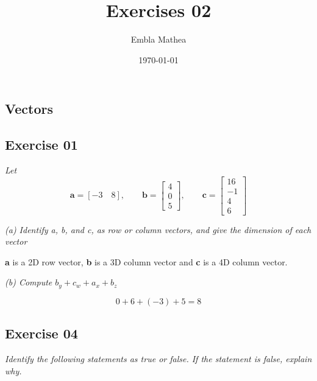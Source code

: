 \documentclass[12pt, a4paper]{article}
\title{Exercises 02}
\author{Embla Mathea}
\date{\today}
\begin{document}
\maketitle

\begin{center}
	\section*{Vectors}	
\end{center}

\subsection*{Exercise 01}

\quad

\textit{Let}
\begin{equation}
		\tag*{}
		\mathbf{a} = \left[-3\quad8\right], \qquad			
		\mathbf{b} =
		\begin{bmatrix}
		4\\0\\5
		\end{bmatrix}, \qquad		
		\mathbf{c} =
		\begin{bmatrix}
		16\\-1\\4\\6
		\end{bmatrix}
\end{equation}

\textit{(a) Identify a, b, and c, as row or column vectors, and give the dimension
of each vector}

	\begin{center}
		\textbf{a} is a 2D row vector, \textbf{b} is a 3D column vector 	
		and \textbf{c} is a 4D column vector. \\
	\end{center}

\textit{(b) Compute $b_y + c_w + a_x + b_z$}

	\begin{equation}
		\tag*{}
		0 + 6 + (-3) + 5 = 8
	\end{equation}
	
\subsection*{Exercise 04}

\quad

\textit
{
	Identify the following statements as true or false. If the
	statement is false, explain why.\\
}
\end{document}
